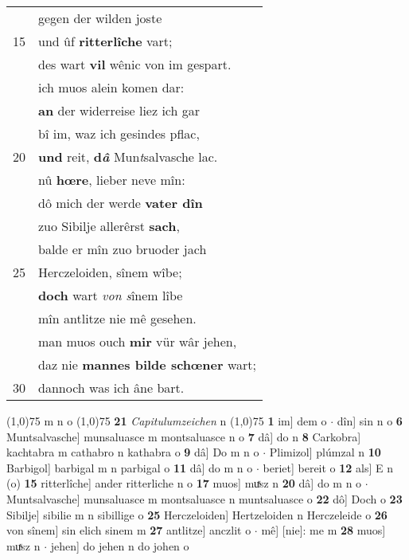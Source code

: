 \documentclass[8pt,a4paper,notitlepage]{article}
\begin{document}
\begin{table}[ht]
\begin{minipage}[t]{0.5\linewidth}
\begin{tabular}{rl}
 & gegen der wilden joste\\ 
15 & und ûf \textbf{ritterlîche} vart;\\ 
 & des wart \textbf{vil} wênic von im gespart.\\ 
 & ich muos alein komen dar:\\ 
 & \textbf{an} der widerreise liez ich gar\\ 
 & bî im, waz ich gesindes pflac,\\ 
20 & \textbf{und} reit, \textbf{d\textit{â}} Mun\textit{t}salvasche lac.\\ 
 & nû \textbf{hœre}, lieber neve mîn:\\ 
 & dô mich der werde \textbf{vater dîn}\\ 
 & zuo Sibilje allerêrst \textbf{sach},\\ 
 & balde er mîn zuo bruoder jach\\ 
25 & Herczeloiden, sînem wîbe;\\ 
 & \textbf{doch} wart \textit{von s}înem lîbe\\ 
 & mîn antlitze nie mê gesehen.\\ 
 & man muos ouch \textbf{mir} vür wâr jehen,\\ 
 & daz nie \textbf{mannes bilde schœner} wart;\\ 
30 & dannoch was ich âne bart.\\ 
\end{tabular}
\scriptsize
\line(1,0){75} \newline
m n o \newline
\line(1,0){75} \newline
\textbf{21} \textit{Capitulumzeichen} n  \newline
\line(1,0){75} \newline
\textbf{1} im] dem o  $\cdot$ dîn] sin n o \textbf{6} Muntsalvasche] munsaluasce m montsaluasce n o \textbf{7} dâ] do n \textbf{8} Carkobra] kachtabra m cathabro n kathabra o \textbf{9} dâ] Do m n o  $\cdot$ Plimizol] plúmzal n \textbf{10} Barbigol] barbigal m n parbigal o \textbf{11} dâ] do m n o  $\cdot$ beriet] bereit o \textbf{12} als] E n (o) \textbf{15} ritterlîche] ander ritterliche n o \textbf{17} muos] muͯsz n \textbf{20} dâ] do m n o  $\cdot$ Muntsalvasche] munsaluasce m montsaluasce n muntsaluasce o \textbf{22} dô] Doch o \textbf{23} Sibilje] sibilie m n sibillige o \textbf{25} Herczeloiden] Hertzeloiden n Herczeleide o \textbf{26} von sînem] sin elich sinem m \textbf{27} antlitze] anczlit o  $\cdot$ mê] [nie]: me m \textbf{28} muos] muͯsz n  $\cdot$ jehen] do jehen n do johen o \newline
\end{minipage}
\end{table}
\end{document}
